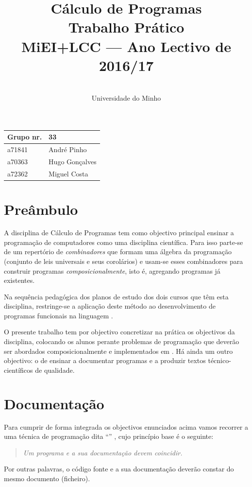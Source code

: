 \documentclass[a4paper]{article}
\title{
       	    Cálculo de Programas
\\
       	Trabalho Prático
\\
       	MiEI+LCC --- Ano Lectivo de 2016/17
}
\author{
       	\dium
\\
       	Universidade do Minho
}
\date\mydate
\begin{document}
\maketitle

\begin{center}\large
\begin{tabular}{ll}
\textbf{Grupo} nr. & 33
\\\hline
a71841 & André Pinho
\\
a70363 & Hugo Gonçalves
\\
a72362 & Miguel Costa
\end{tabular}
\end{center}

\tableofcontents

\newpage

\section{Preâmbulo}

A disciplina de Cálculo de Programas tem como objectivo principal ensinar
a progra\-mação de computadores como uma disciplina científica. Para isso
parte-se de um repertório de \emph{combinadores} que formam uma álgebra da
programação (conjunto de leis universais e seus corolários) e usam-se esses
combinadores para construir programas \emph{composicionalmente}, isto é,
agregando programas já existentes.

Na sequência pedagógica dos planos de estudo dos dois cursos que têm esta
disciplina, restringe-se a aplicação deste método ao desenvolvimento de programas
funcionais na linguagem \Haskell.

O presente trabalho tem por objectivo concretizar na prática os objectivos
da disciplina, colocando os alunos perante problemas de programação que
deverão ser abordados composicionalmente e implementados em \Haskell.
Há ainda um outro objectivo: o de ensinar a documentar programas e
a produzir textos técnico-científicos de qualidade.

\section{Documentação}
Para cumprir de forma integrada os objectivos enunciados acima vamos recorrer
a uma técnica de programa\-ção dita ``'' \cite{Kn92}, cujo
princípio base é o seguinte:
\begin{quote}\em
Um programa e a sua documentação devem coincidir.
\end{quote}
Por outras palavras, o código fonte e a sua documentação deverão constar
do mesmo documento (ficheiro).
\end{document}
